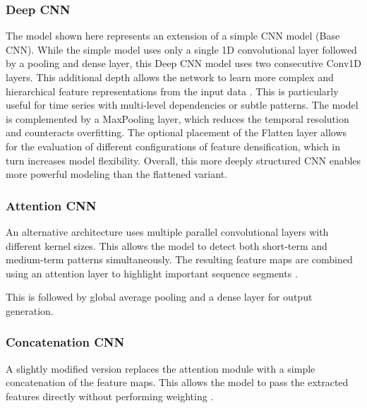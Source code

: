 \subsubsection{Deep CNN}

The model shown here represents an extension of a simple CNN model (Base CNN).
While the simple model uses only a single 1D convolutional layer followed by a pooling and dense layer, this Deep CNN model uses two consecutive Conv1D layers.
This additional depth allows the network to learn more complex and hierarchical feature representations from the input data \cite{cnn-deep-more-complex}.
This is particularly useful for time series with multi-level dependencies or subtle patterns.
The model is complemented by a MaxPooling layer, which reduces the temporal resolution and counteracts overfitting.
The optional placement of the Flatten layer allows for the evaluation of different configurations of feature densification, which in turn increases model flexibility.
Overall, this more deeply structured CNN enables more powerful modeling than the flattened variant.



\subsubsection{Attention CNN}

An alternative architecture uses multiple parallel convolutional layers with different kernel sizes.
This allows the model to detect both short-term and medium-term patterns simultaneously.
The resulting feature maps are combined using an attention layer to highlight important sequence segments \cite{cnn-attention}.

This is followed by global average pooling and a dense layer for output generation.



\subsubsection{Concatenation CNN}

A slightly modified version replaces the attention module with a simple concatenation of the feature maps.
This allows the model to pass the extracted features directly without performing weighting \cite{keras-concat}.

